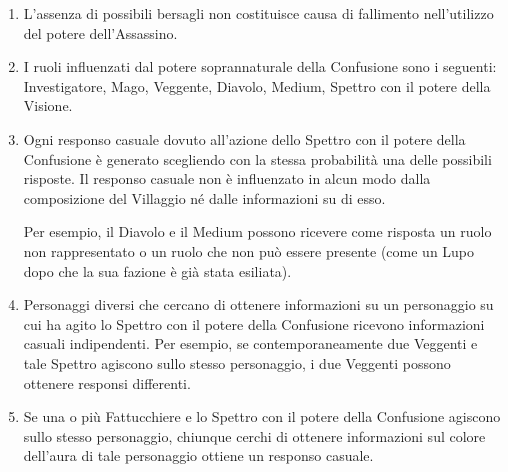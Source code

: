 \documentclass[a4paper,10pt]{article}
\begin{document}
\begin{enumerate}
 \item L'assenza di possibili bersagli non costituisce causa di fallimento nell'utilizzo del potere dell'Assassino.
 
 \item I ruoli influenzati dal potere soprannaturale della Confusione sono i seguenti: Investigatore, Mago, Veggente, Diavolo, Medium, Spettro con il potere della Visione.
 
 \item Ogni responso casuale dovuto all'azione dello Spettro con il potere della Confusione è generato scegliendo con la stessa probabilità una delle possibili risposte.
 Il responso casuale non è influenzato in alcun modo dalla composizione del Villaggio né dalle informazioni su di esso.
 
 Per esempio, il Diavolo e il Medium possono ricevere come risposta un ruolo non rappresentato o un ruolo che non può essere presente (come un Lupo dopo che la sua fazione è già stata esiliata).
 
 \item Personaggi diversi che cercano di ottenere informazioni su un personaggio su cui ha agito lo Spettro con il potere della Confusione ricevono informazioni casuali indipendenti.
 Per esempio, se contemporaneamente due Veggenti e tale Spettro agiscono sullo stesso personaggio, i due Veggenti possono ottenere responsi differenti.
 
 \item Se una o più Fattucchiere e lo Spettro con il potere della Confusione agiscono sullo stesso personaggio, chiunque cerchi di ottenere informazioni sul colore dell'aura di tale personaggio ottiene un responso casuale.
 
%  
 

\end{enumerate}
\end{document}
